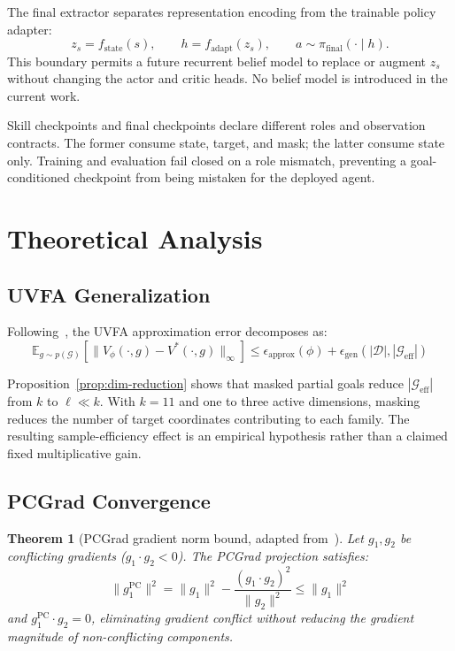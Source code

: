 \documentclass[11pt,a4paper]{article}
\newtheorem{theorem}{Theorem}
\begin{document}
The final extractor separates representation encoding from the trainable policy adapter:
\begin{equation}
z_s = f_{\mathrm{state}}(s), \qquad h = f_{\mathrm{adapt}}(z_s), \qquad a \sim \pi_{\mathrm{final}}(\cdot\mid h).
\end{equation}
This boundary permits a future recurrent belief model to replace or augment $z_s$ without changing the actor and critic heads. No belief model is introduced in the current work.

Skill checkpoints and final checkpoints declare different roles and observation contracts. The former consume state, target, and mask; the latter consume state only. Training and evaluation fail closed on a role mismatch, preventing a goal-conditioned checkpoint from being mistaken for the deployed agent.

\section{Theoretical Analysis}
\label{sec:theory}

\subsection{UVFA Generalization}

Following~\cite{schaul2015universal}, the UVFA approximation error decomposes as:
\begin{equation}
\mathbb{E}_{g \sim p(\mathcal{G})}\left[\|V_\phi(\cdot, g) - V^*(\cdot, g)\|_\infty\right] \leq \epsilon_{\text{approx}}(\phi) + \epsilon_{\text{gen}}(|\mathcal{D}|, |\mathcal{G}_{\text{eff}}|)
\label{eq:uvfa-bound}
\end{equation}

Proposition~\ref{prop:dim-reduction} shows that masked partial goals reduce $|\mathcal{G}_{\text{eff}}|$ from $k$ to $\ell \ll k$.
With $k=11$ and one to three active dimensions, masking reduces the number of target coordinates contributing to each family. The resulting sample-efficiency effect is an empirical hypothesis rather than a claimed fixed multiplicative gain.

\subsection{PCGrad Convergence}

\begin{theorem}[PCGrad gradient norm bound, adapted from~\cite{yu2020gradient}]
Let $g_1, g_2$ be conflicting gradients ($g_1 \cdot g_2 < 0$).
The PCGrad projection satisfies:
\begin{equation}
\|g_1^{\text{PC}}\|^2 = \|g_1\|^2 - \frac{(g_1 \cdot g_2)^2}{\|g_2\|^2} \leq \|g_1\|^2
\end{equation}
and $g_1^{\text{PC}} \cdot g_2 = 0$, eliminating gradient conflict without reducing the gradient magnitude of non-conflicting components.
\end{theorem}
\end{document}
